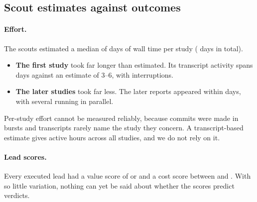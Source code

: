 \subsection{Scout estimates against outcomes}

\paragraph{Effort.} The scouts estimated a median of \ScoutDaysMedian{} days of wall time per study (\ScoutDaysTotal{}
days in total).
\begin{itemize}
\item \textbf{The first study} took far longer than estimated. Its transcript activity spans \GWTCSpanDays{} days
against an estimate of 3--6, with interruptions.
\item \textbf{The later studies} took far less. The \ReportsAfterFirst{} later reports appeared within
\CalendarBulkDays{} days, with several running in parallel.
\end{itemize}
Per-study effort cannot be measured reliably, because commits were made in bursts and transcripts rarely name the study
they concern. A transcript-based estimate gives \EffortActiveHoursTotal{} active hours across all studies, and we do
not rely on it.

\paragraph{Lead scores.} Every executed lead had a value score of \ValueMin{} or \ValueMax{} and a cost score between
\CostMin{} and \CostMax{}. With so little variation, nothing can yet be said about whether the scores predict verdicts.
